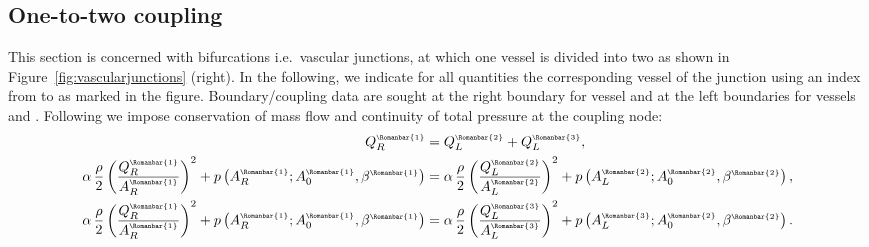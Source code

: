 \documentclass[a4paper,11pt]{article}
\newcommand{\Rmn}[1]{\Romanbar #1}
\newcommand{\rmn}[1]{\text{\tiny \Romanbar{#1}}}
\begin{document}
\subsection{One-to-two coupling}
	This section is concerned with bifurcations i.e.\ vascular junctions, at which one vessel is divided into two as shown in Figure~\ref{fig:vascularjunctions} (right).
  In the following, we indicate for all quantities the corresponding vessel of the junction using an index from \Rmn{1} to \Rmn{3} as marked in the figure. Boundary/coupling data are sought at the right boundary for vessel \Rmn{1} and at the left boundaries for vessels \Rmn{2} and \Rmn{3}. Following \cite{formaggia2003} we impose conservation of mass flow and continuity of total pressure at the coupling node:
  \begin{align}
    Q_R^\rmn{1} &= Q_L^\rmn{2} + Q_L^\rmn{3},\label{eq:flowconservation}\\
    \alpha \, \frac{\rho}{2} \left( \frac{Q_R^\rmn{1}}{A_R^\rmn{1}} \right)^2 + p\left( A_R^\rmn{1}; A_0^{\rmn{1}}, \beta^{\rmn{1}} \right) &= \alpha \, \frac{\rho}{2} \left( \frac{Q_L^\rmn{2}}{A_L^\rmn{2}} \right)^2 + p\left( A_L^\rmn{2}; A_0^{\rmn{2}}, \beta^{\rmn{2}} \right),\\
    \alpha \, \frac{\rho}{2} \left( \frac{Q_R^\rmn{1}}{A_R^\rmn{1}} \right)^2 + p\left( A_R^\rmn{1}; A_0^{\rmn{1}}, \beta^{\rmn{1}} \right) &= \alpha \, \frac{\rho}{2} \left( \frac{Q_L^\rmn{3}}{A_L^\rmn{3}} \right)^2 + p\left( A_L^\rmn{3}; A_0^{\rmn{2}}, \beta^{\rmn{2}} \right).
  \end{align}
  
\end{document}
